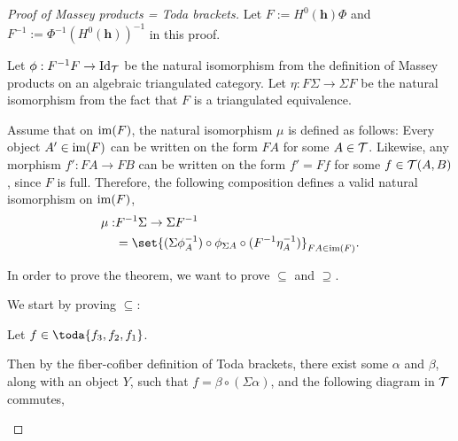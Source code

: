 \begin{proof}[Proof of Massey products = Toda brackets]
    Let \( F := H^0(\mathbf{h}) \Phi \) and \( F^{-1} := \Phi^{-1} (H^0(\mathbf{h}))^{-1} \) in this proof.

    Let \( \phi: F^{-1} F \to \operatorname{Id}_{{\mathcal{T}}} \) be the natural isomorphism from the definition of Massey products on an algebraic triangulated category. Let \( \eta: F \Sigma \to \Sigma F \) be the natural isomorphism from the fact that \( F \) is a triangulated equivalence.

    Assume that on \( \operatorname{im}(F) \), the natural isomorphism \( \mu \) is defined as follows: Every object \( A' \in \operatorname{im}(F) \) can be written on the form \( F A \) for some \( A \in {\mathcal{T}} \). Likewise, any morphism \( f': F A \to F B \) can be written on the form \( f' = F f \) for some \( f \in {\mathcal{T}}(A, B) \), since \( F \) is full. Therefore, the following composition defines a valid natural isomorphism on \( \operatorname{im}(F) \),
    \begin{align*}
        \mu: &F^{-1} \Sigma \to \Sigma F^{-1} \\
        &= \set{ (\Sigma \phi^{-1}_A) \circ \phi_{\Sigma A} \circ (F^{-1} \eta^{-1}_A)}_{F A \in \im(F)}.
    \end{align*}

    In order to prove the theorem, we want to prove \( \subseteq \) and \( \supseteq \).

    We start by proving \( \subseteq \):
    
    Let \( f \in \toda{f_3, f_2, f_1} \).

    Then by the fiber-cofiber definition of Toda brackets, there exist some \( \alpha \) and \( \beta \), along with an object \( Y \), such that \( f = \beta \circ (\Sigma \alpha) \), and the following diagram in \( {\mathcal{T}} \) commutes,
    \begin{center}
\end{center}
\end{proof}
